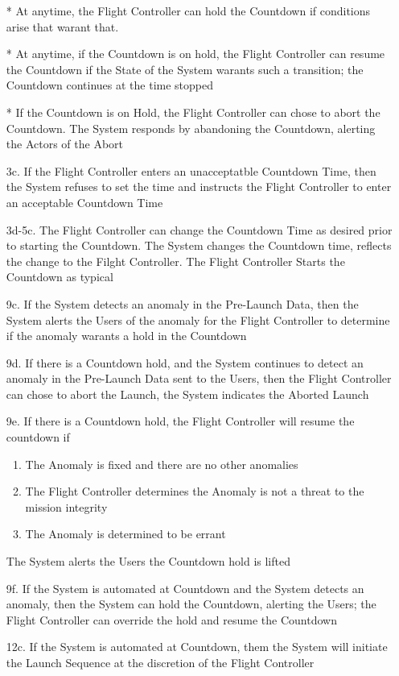 \documentclass[letterpaper]{article}
\begin{document}
\begin{itemize}
\item[*]  At anytime, the Flight Controller can hold the Countdown
if conditions arise that warant that.
\item[*] At anytime, if the Countdown is on hold, the Flight
Controller can resume the Countdown if the State of the System warants
such a transition;  the Countdown continues at the time stopped
\item[*] If the Countdown is on Hold, the Flight Controller can chose
to
abort the Countdown.  The System responds by abandoning the Countdown,
alerting the Actors of the Abort
\item[3c.]If the Flight Controller enters an unacceptatble Countdown
Time, then the System refuses to set the time and instructs the
Flight Controller to enter an acceptable Countdown Time
\item[3d-5c.]The Flight Controller can change the Countdown Time as
desired prior to starting the Countdown.  The System changes the
Countdown time, reflects the change to the Filght Controller.  The
Flight Controller Starts the Countdown as typical
\item[9c.]  If the System detects an anomaly in the
Pre-Launch Data, then the System alerts the Users of the anomaly for
the Flight Controller to determine if the anomaly warants a hold in
the
Countdown
\item[9d.]  If there is a Countdown hold, and the System continues to
detect an anomaly in the Pre-Launch Data sent to the Users, then the
Flight Controller can chose to abort the Launch, the System indicates
the Aborted Launch
\item[9e.]  If there is a Countdown hold, the Flight Controller will
resume the countdown if
\begin{enumerate}
\item The Anomaly is fixed and there are no other anomalies
\item The Flight Controller determines the Anomaly is not a threat
to the mission integrity
\item The Anomaly is determined to be errant
\end{enumerate}
The System alerts the Users the Countdown hold is lifted
\item[9f.] If the System is automated at Countdown and the System
detects an anomaly, then the System can hold the Countdown, alerting
the Users;  the Flight Controller can override the hold and resume the
Countdown
\item[12c.] If the System is automated at Countdown, them the System
will initiate the Launch Sequence at the discretion of the Flight
Controller
\end{itemize}
\end{document}
